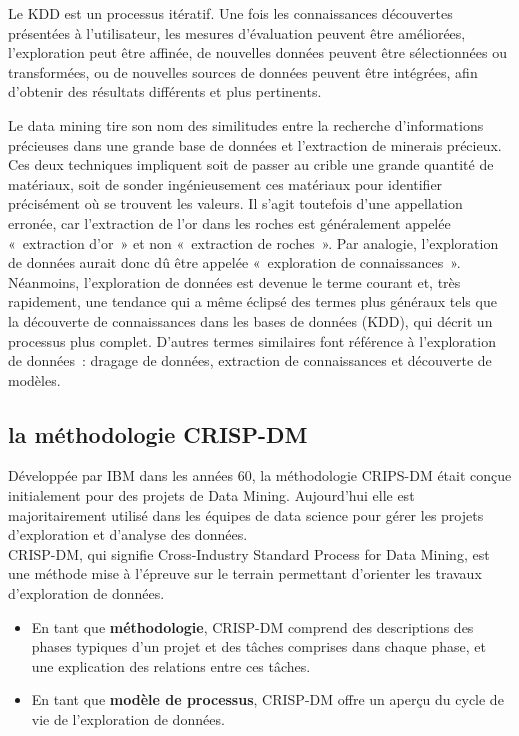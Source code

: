 \documentclass[a4paper,14pt]{article}
\begin{document}
        Le KDD est un processus itératif. Une fois les connaissances découvertes présentées à l'utilisateur, les mesures d'évaluation peuvent être améliorées, l'exploration peut être affinée, de nouvelles données peuvent être sélectionnées ou transformées, ou de nouvelles sources de données peuvent être intégrées, afin d'obtenir des résultats différents et plus pertinents.

        Le data mining tire son nom des similitudes entre la recherche d'informations précieuses dans une grande base de données et l'extraction de minerais précieux. Ces deux techniques impliquent soit de passer au crible une grande quantité de matériaux, soit de sonder ingénieusement ces matériaux pour identifier précisément où se trouvent les valeurs. Il s'agit toutefois d'une appellation erronée, car l'extraction de l'or dans les roches est généralement appelée « extraction d'or » et non « extraction de roches ». Par analogie, l'exploration de données aurait donc dû être appelée « exploration de connaissances ». Néanmoins, l'exploration de données est devenue le terme courant et, très rapidement, une tendance qui a même éclipsé des termes plus généraux tels que la découverte de connaissances dans les bases de données (KDD), qui décrit un processus plus complet. D'autres termes similaires font référence à l'exploration de données : dragage de données, extraction de connaissances et découverte de modèles.

    \subsection{la méthodologie CRISP-DM}
        Développée par IBM dans les années 60, la méthodologie CRIPS-DM était conçue initialement pour des projets de Data Mining. Aujourd'hui elle est majoritairement utilisé dans les équipes de data science pour gérer les projets d’exploration et d’analyse des données.\\
        CRISP-DM, qui signifie Cross-Industry Standard Process for Data Mining, est une méthode mise à l'épreuve sur le terrain permettant d'orienter les travaux d'exploration de données.
        \begin{itemize}
            \item En tant que \textbf{méthodologie}, CRISP-DM comprend des descriptions des phases typiques d'un projet et des tâches comprises dans chaque phase, et une explication des relations entre ces tâches.
            \item En tant que \textbf{modèle de processus}, CRISP-DM offre un aperçu du cycle de vie de l'exploration de données.
        \end{itemize}
        
\end{document}
